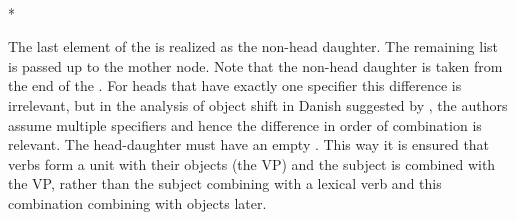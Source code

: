 \documentclass[output=paper]{langsci/langscibook}
\begin{document}
\begin{schema}\label{hss}
 \impl\\*
\end{schema}
The last element of the \sprl is realized as the non-head daughter. The remaining list is passed up
to the mother node. 
Note that the non-head daughter is taken from the end of the \sprl. For heads that have exactly one specifier this
difference is irrelevant, but in the analysis of object shift in Danish suggested by \citet{MOe2013b},
the authors assume multiple specifiers and hence the difference in order of combination is
relevant. The head-daughter must have an empty \compsl. This way it is ensured that verbs form a
unit with their objects (the VP) and the subject is combined with the VP, rather than the subject
combining with a lexical verb and this combination combining with objects later.
\end{document}
